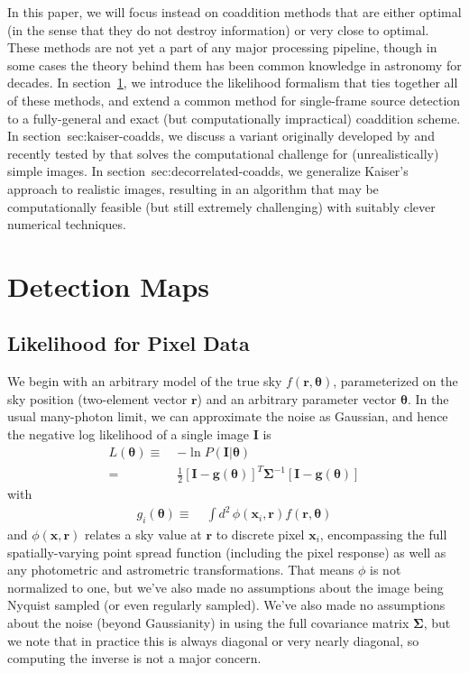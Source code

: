 \documentclass[10pt]{article}
\begin{document}
In this paper, we will focus instead on coaddition methods that are either optimal (in the sense that they do not destroy information) or very close to optimal.  These methods are not yet a part of any major processing pipeline, though in some cases the theory behind them has been common knowledge in astronomy for decades.  In section~\ref{sec:detection-maps}, we introduce the likelihood formalism that ties together all of these methods, and extend a common method for single-frame source detection to a fully-general and exact (but computationally impractical) coaddition scheme.  In section~{sec:kaiser-coadds}, we discuss a variant originally developed by \cite{Kaiser2001} and recently tested by \cite{2015arXiv151206879Z} that solves the computational challenge for (unrealistically) simple images.  In section~{sec:decorrelated-coadds}, we generalize Kaiser's approach to realistic images, resulting in an algorithm that may be computationally feasible (but still extremely challenging) with suitably clever numerical techniques.

\section{Detection Maps}
\label{sec:detection-maps}

\subsection{Likelihood for Pixel Data}

We begin with an arbitrary model of the true sky $f(\bm{r}, \bm{\theta})$, parameterized on the sky position (two-element vector $\bm{r}$) and an arbitrary parameter vector $\bm{\theta}$.  In the usual many-photon limit, we can approximate the noise as Gaussian, and hence the negative log likelihood of a single image $\bm{I}$ is
\begin{align}
    L(\bm{\theta}) \equiv\;& -\ln P(\bm{I}|\bm{\theta}) \\
    =\;& \frac{1}{2}
        \left[\bm{I} - \bm{g}(\bm{\theta})\right]^T
        \bm{\Sigma}^{-1}
        \left[\bm{I} - \bm{g}(\bm{\theta})\right]
\end{align}
with
\begin{align}
g_i(\bm{\theta}) \equiv\;&
    \int\! d^2 \,\phi(\bm{x}_i,\bm{r})
        f(\bm{r},\bm{\theta})
\end{align}
and $\phi(\bm{x},\bm{r})$ relates a sky value at $\bm{r}$ to discrete pixel $\bm{x}_i$, encompassing the full spatially-varying point spread function (including the pixel response) as well as any photometric and astrometric transformations.  That means $\phi$ is not normalized to one, but we've also made no assumptions about the image being Nyquist sampled (or even regularly sampled).  We've also made no assumptions about the noise (beyond Gaussianity) in using the full covariance matrix $\bm{\Sigma}$, but we note that in practice this is always diagonal or very nearly diagonal, so computing the inverse is not a major concern.
\end{document}
